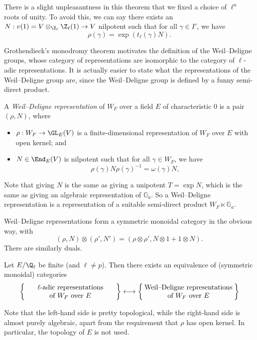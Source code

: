 \documentclass[a4paper]{article}
\renewcommand\G{\mathbb{G}}
\begin{document}
There is a slight unpleasantness in this theorem that we fixed a choice of $\ell^n$ roots of unity. To avoid this, we can say there exists an $N: v(1) = V \otimes_{\Z_\ell} \Z_{\ell}(1) \to V$ nilpotent such that for all $\gamma \in I'$, we have
\[
  \rho(\gamma) = \exp (t_\ell(\gamma) N).
\]

Grothendieck's monodromy theorem motivates the definition of the Weil--Deligne groups, whose category of representations are isomorphic to the category of $\ell$-adic representations. It is actually easier to state what the representations of the Weil--Deligne group are, since the Weil--Deligne group is defined by a funny semi-direct product.

\begin{defi}
  A \emph{Weil--Deligne representation} of $W_F$ over a field $E$ of characteristic $0$ is a pair $(\rho, N)$, where
  \begin{itemize}
    \item $\rho: W_F \to \GL_E(V)$ is a finite-dimensional representation of $W_F$ over $E$ with open kernel; and
    \item $N \in \End_E(V)$ is nilpotent such that for all $\gamma \in W_F$, we have
      \[
        \rho(\gamma) N \rho(\gamma)^{-1} = \omega(\gamma) N,
      \]
  \end{itemize}
\end{defi}
Note that giving $N$ is the same as giving a unipotent $T = \exp N$, which is the same as giving an algebraic representation of $\G_a$. So a Weil--Deligne representation is a representation of a suitable semi-direct product $W_F \ltimes \G_a$.

Weil--Deligne representations form a symmetric monoidal category in the obvious way, with
\[
  (\rho, N ) \otimes (\rho', N') = (\rho \otimes \rho', N \otimes 1 + 1 \otimes N).
\]
There are similarly duals.

\begin{thm}
  Let $E/\Q_\ell$ be finite (and $\ell \not= p$). Then there exists an equivalence of (symmetric monoidal) categories
  \[
    \left\{\parbox{4.6cm}{\centering $\ell$-adic representations\\ of $W_F$ over $E$}\right\} \longleftrightarrow \left\{\parbox{4.6cm}{\centering Weil--Deligne representations of $W_F$ over $E$}\right\}
  \]
\end{thm}
Note that the left-hand side is pretty topological, while the right-hand side is almost purely algebraic, apart from the requirement that $\rho$ has open kernel. In particular, the topology of $E$ is not used.
\end{document}
